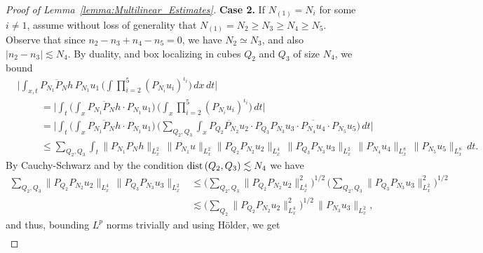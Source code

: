 \documentclass[11pt, xcolor = dvipsnames,reqno
]{amsart}
\theoremstyle{definition}
\theoremstyle{remark}
\newcommand{\dist} {\text{dist\! }}
\begin{document}
\begin{proof}[Proof of Lemma~\ref{lemma:Multilinear_Estimates}]
\textbf{Case 2. }
If $N_{(1)} = N_i$ for some $i \neq 1$, 
    assume without loss of generality that $N_{(1)} = N_2 \geq N_3 \geq N_4 \geq N_5$. 
    Observe that since $n_2 - n_3 + n_4 - n_5 = 0$, we have $N_2 \simeq N_3$, 
    and also $|n_2 - n_3| \lesssim N_4$. 
    By duality, and box localizing in cubes $Q_2$ and $Q_3$ of size $N_4$, 
    we bound
    \begin{align}\label{eq:N_2Largest}
        & \Big|\int_{x,t} \overline{P_{N_1}P_N h} \,  P_{N_1} u_1 \, \bigg(\int \prod_{i=2}^5 (P_{N_i} u_i)^{\iota_i} \bigg) \, dx\, dt \Big| \nonumber \\
        & \hspace{1cm} = 
        \Big|\int_t \bigg( \int_x \overline{P_{N_1}P_N h} \cdot  P_{N_1} u_1 \bigg)\, \bigg(\int_x \prod_{i=2}^5 (P_{N_i} u_i)^{\iota_i} \bigg) \, dt \Big|   \\
        & \hspace{1cm} = 
        \Big| \int_t \bigg( \int_x \overline{P_{N_1}P_N h} \cdot  P_{N_1} u_1 \bigg)\, \bigg( \sum_{Q_2, Q_3}\int_x \overline{P_{Q_2}P_{N_2} u_2} \cdot P_{Q_3}P_{N_3} u_3  \cdot \overline{P_{N_4} u_4} \cdot P_{N_5} u_5\bigg) \, dt \Big|  \nonumber \\
        & \hspace{1cm} \leq 
        \sum_{Q_2, Q_3}
        \int_t \lVert P_{N_1}P_N h \rVert_{L_x^2}  \, \lVert P_{N_1} u \rVert_{L_x^2}  
        \lVert P_{Q_2} P_{N_2} u_2 \rVert_{L_x^4} \, 
        \lVert P_{Q_3}P_{N_3} u_3 \rVert_{L_x^2} \, 
        \lVert P_{N_4} u_4 \rVert_{L_x^8} \, 
        \lVert P_{N_5} u_5 \rVert_{L_x^8} \, dt. \nonumber
    \end{align}
    By Cauchy-Schwarz and by the condition $\dist(Q_2, Q_3) \lesssim N_4$ we have
    \begin{align}
        \sum_{Q_2, Q_3}
        \lVert P_{Q_2} P_{N_2} u_2 \rVert_{L_x^4} \, 
        \lVert P_{Q_3}P_{N_3} u_3 \rVert_{L_x^2} 
        & \leq 
        \Big( \sum_{Q_2, Q_3}
        \lVert P_{Q_2} P_{N_2} u_2 \rVert_{L_x^4}^2 \Big)^{1/2} \, 
        \Big( \sum_{Q_2, Q_3}
        \lVert P_{Q_3}P_{N_3} u_3 \rVert_{L_x^2}^2 \Big)^{1/2} \\
        & \lesssim 
        \Big( \sum_{Q_2}
        \lVert P_{Q_2} P_{N_2} u_2 \rVert_{L_x^4}^2 \Big)^{1/2} \, 
        \lVert P_{N_3} u_3 \rVert_{L_x^2},
    \end{align}
    and thus, bounding $L^p$ norms trivially and using H\"older, we get
    \begin{align}\label{eq:Multilinear_Almost_Last_Step}

\end{align}
\end{proof}
\end{document}
